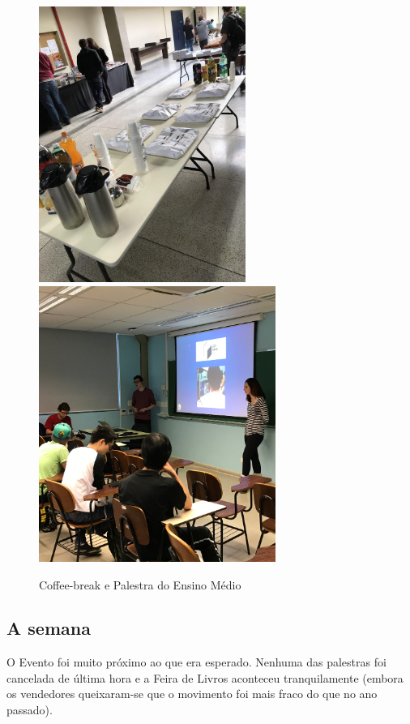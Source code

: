 \documentclass[12pt,letterpaper]{article}
\begin{document}
	\begin{figure}
		\begin{center}
			\includegraphics[height=9cm]{comida.jpg}  
			\includegraphics[height=9cm]{em2.jpg}
			\caption{Coffee-break e Palestra do Ensino Médio} 
		\end{center}
	\end{figure}
	
	\subsection{A semana}
	
	O Evento foi muito próximo ao que era esperado. Nenhuma das palestras foi cancelada de última hora e a Feira de Livros aconteceu tranquilamente (embora os vendedores queixaram-se que o movimento foi mais fraco do que no ano passado).
	
\end{document}
